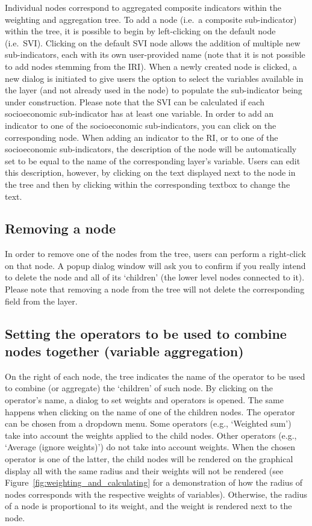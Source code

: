 Individual nodes correspond to aggregated composite indicators within the
weighting and aggregation tree. To add a node (i.e.\ a composite sub-indicator)
within the tree, it is possible to begin by left-clicking on the default node
(i.e.\ SVI).  Clicking on the default SVI node allows the addition of multiple
new sub-indicators, each with its own user-provided name (note that it is not
possible to add nodes stemming from the IRI). When a newly created node is
clicked, a new dialog is initiated to give users the option to select the
variables available in the layer (and not already used in the node) to populate
the sub-indicator being under construction. Please note that the SVI can be
calculated if each socioeconomic sub-indicator has at least one variable. In
order to add an indicator to one of the socioeconomic sub-indicators, you can
click on the corresponding node. When adding an indicator to the RI, or to one
of the socioeconomic sub-indicators, the description of the node will be
automatically set to be equal to the name of the corresponding layer's
variable. Users can edit this description, however, by clicking on the text
displayed next to the node in the tree and then by clicking within the
corresponding textbox to change the text.


\subsection{Removing a node}

In order to remove one of the nodes from the tree, users can perform a
right-click on that node. A popup dialog window will ask you to confirm if you
really intend to delete the node and all of its `children' (the lower level
nodes connected to it). Please note that removing a node from the tree will not
delete the corresponding field from the layer.


\subsection{Setting the operators to be used to combine nodes together
(variable aggregation)}
\label{sec:setting_operators}

On the right of each node, the tree indicates the name of the operator to be
used to combine (or aggregate) the `children' of such node. By clicking on the
operator's name, a dialog to set weights and operators is opened. The same
happens when clicking on the name of one of the children nodes. The operator
can be chosen from a dropdown menu. Some operators (e.g., `Weighted sum') take
into account the weights applied to the child nodes. Other operators (e.g.,
`Average (ignore weights)') do not take into account weights. When the chosen
operator is one of the latter, the child nodes will be rendered on the
graphical display all with the same radius and their weights will not be
rendered (see Figure~\ref{fig:weighting_and_calculating} for a demonstration of
how the radius of nodes corresponds with the respective weights of variables).
Otherwise, the radius of a node is proportional to its weight, and the weight
is rendered next to the node.


